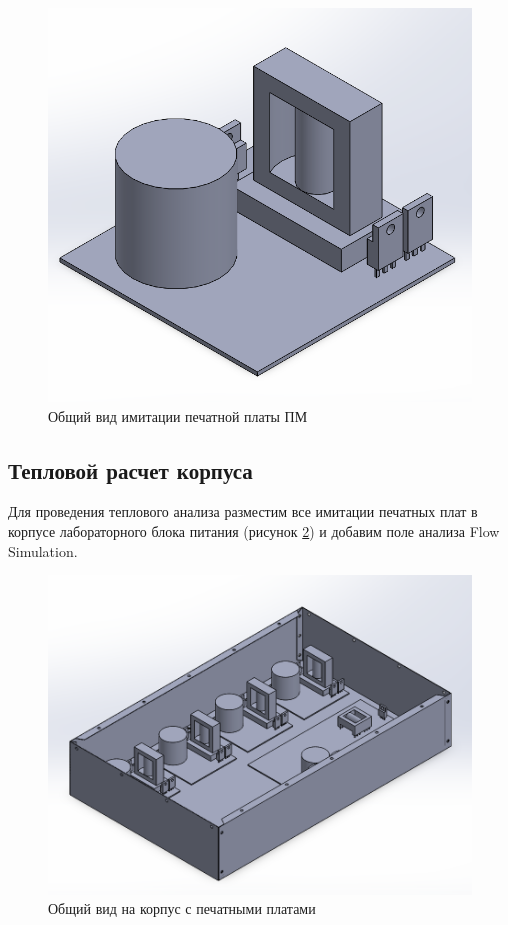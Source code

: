 \documentclass[utf8x, 14pt, oneside, a4paper]{article}
\begin{document}
		\begin{figure}[H]
			\centering
			\includegraphics[width=0.9\linewidth]{"Рисунки/Solid-pm-view"}
			\caption{Общий вид имитации печатной платы ПМ}
			\label{fig:solid-pm-view}
		\end{figure}
		
		\subsection{Тепловой расчет корпуса}
		
		Для проведения теплового анализа разместим все имитации печатных плат в корпусе лабораторного блока питания (рисунок \ref{fig:solid-bp-view}) и добавим поле анализа Flow Simulation.
		
		\begin{figure}[H]
			\centering
			\includegraphics[width=0.9\linewidth]{"Рисунки/Solid-bp-view"}
			\caption{Общий вид на корпус с печатными платами}
			\label{fig:solid-bp-view}
		\end{figure}
	
\end{document}
